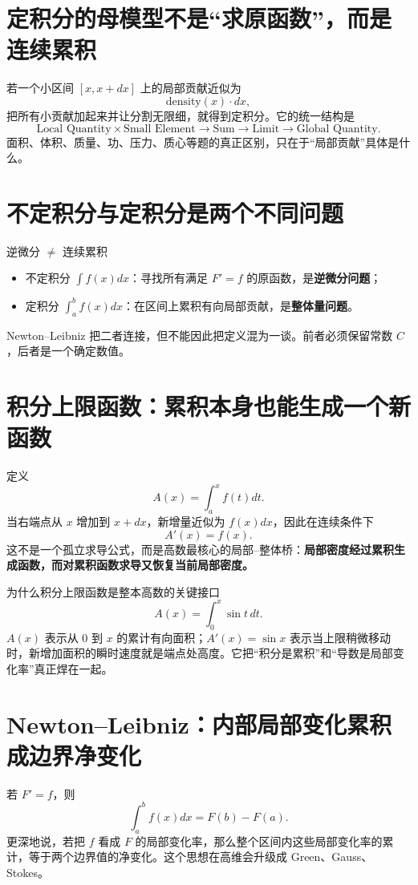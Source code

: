 \documentclass[11pt,a4paper,openany]{ctexbook}
\newcommand{\key}[1]{\textbf{\color{deep}#1}}
\begin{document}
\section{定积分的母模型不是“求原函数”，而是连续累积}
若一个小区间 $[x,x+dx]$ 上的局部贡献近似为
\[
\text{density}(x)\cdot dx,
\]
把所有小贡献加起来并让分割无限细，就得到定积分。它的统一结构是
\[
\boxed{\text{Local Quantity}\times\text{Small Element}\to\text{Sum}\to\text{Limit}\to\text{Global Quantity}}.
\]
面积、体积、质量、功、压力、质心等题的真正区别，只在于“局部贡献”具体是什么。

\section{不定积分与定积分是两个不同问题}
\begin{boundarybox}{逆微分 $\neq$ 连续累积}
\begin{itemize}
  \item 不定积分 $\int f(x)dx$：寻找所有满足 $F'=f$ 的原函数，是\key{逆微分问题}；
  \item 定积分 $\int_a^b f(x)dx$：在区间上累积有向局部贡献，是\key{整体量问题}。
\end{itemize}
Newton--Leibniz 把二者连接，但不能因此把定义混为一谈。前者必须保留常数 $C$，后者是一个确定数值。
\end{boundarybox}

\section{积分上限函数：累积本身也能生成一个新函数}
定义
\[
A(x)=\int_a^x f(t)dt.
\]
当右端点从 $x$ 增加到 $x+dx$，新增量近似为 $f(x)dx$，因此在连续条件下
\[
\boxed{A'(x)=f(x)}.
\]
这不是一个孤立求导公式，而是高数最核心的局部--整体桥：\key{局部密度经过累积生成函数，而对累积函数求导又恢复当前局部密度。}

\begin{examplebox}{为什么积分上限函数是整本高数的关键接口}
\[
A(x)=\int_0^x \sin t\,dt.
\]
$A(x)$ 表示从 0 到 $x$ 的累计有向面积；$A'(x)=\sin x$ 表示当上限稍微移动时，新增加面积的瞬时速度就是端点处高度。它把“积分是累积”和“导数是局部变化率”真正焊在一起。
\end{examplebox}

\section{Newton--Leibniz：内部局部变化累积成边界净变化}
若 $F'=f$，则
\[
\boxed{\int_a^b f(x)dx=F(b)-F(a)}.
\]
更深地说，若把 $f$ 看成 $F$ 的局部变化率，那么整个区间内这些局部变化率的累计，等于两个边界值的净变化。这个思想在高维会升级成 Green、Gauss、Stokes。
\end{document}
